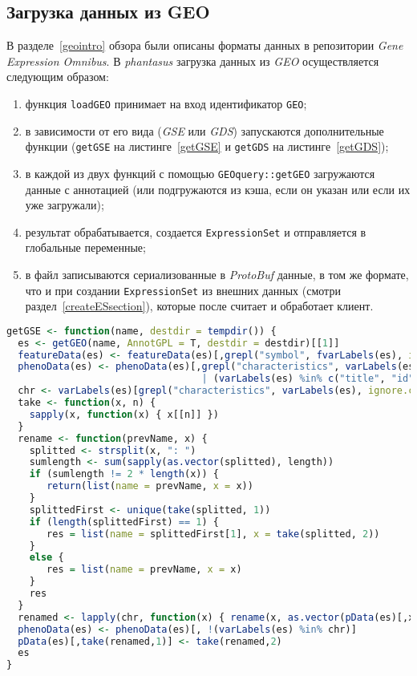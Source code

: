 \subsection{Загрузка данных из GEO}
В разделе~\ref{geointro} обзора были описаны форматы данных в репозитории \emph{Gene Expression Omnibus}.
В \emph{phantasus} загрузка данных из \emph{GEO} осуществляется следующим образом:
\begin{enumerate}
\item функция \texttt{loadGEO} принимает на вход идентификатор \texttt{GEO};
\item в зависимости от его вида (\emph{GSE} или \emph{GDS}) запускаются дополнительные функции (\texttt{getGSE} на листинге~\ref{getGSE} и \texttt{getGDS} на листинге~\ref{getGDS});
\item в каждой из двух функций с помощью \texttt{GEOquery::getGEO} загружаются данные с аннотацией (или подгружаются из кэша, если он указан или если их уже загружали);
\item результат обрабатывается, создается \texttt{ExpressionSet} и отправляется в глобальные переменные;
\item в файл записываются сериализованные в \emph{ProtoBuf} данные, в том же формате, что и при создании \texttt{ExpressionSet} из внешних данных (смотри раздел~\ref{createESsection}), которые после считает и обработает клиент.
\end{enumerate}
\begin{lstlisting}[float=!h,caption={Загрузка данных типа GSE из Gene Expression Omnibus},label={getGSE},language=R]
getGSE <- function(name, destdir = tempdir()) {
  es <- getGEO(name, AnnotGPL = T, destdir = destdir)[[1]]
  featureData(es) <- featureData(es)[,grepl("symbol", fvarLabels(es), ignore.case = T)]
  phenoData(es) <- phenoData(es)[,grepl("characteristics", varLabels(es), ignore.case = T)
                                  | (varLabels(es) %in% c("title", "id", "geo_accession"))]
  chr <- varLabels(es)[grepl("characteristics", varLabels(es), ignore.case = T)]
  take <- function(x, n) {
    sapply(x, function(x) { x[[n]] })
  }
  rename <- function(prevName, x) {
    splitted <- strsplit(x, ": ")
    sumlength <- sum(sapply(as.vector(splitted), length))
    if (sumlength != 2 * length(x)) {
       return(list(name = prevName, x = x))
    }
    splittedFirst <- unique(take(splitted, 1))
    if (length(splittedFirst) == 1) {
       res = list(name = splittedFirst[1], x = take(splitted, 2))
    }
    else {
       res = list(name = prevName, x = x)
    }
    res
  }
  renamed <- lapply(chr, function(x) { rename(x, as.vector(pData(es)[,x])) })
  phenoData(es) <- phenoData(es)[, !(varLabels(es) %in% chr)]
  pData(es)[,take(renamed,1)] <- take(renamed,2)
  es
}
\end{lstlisting}

